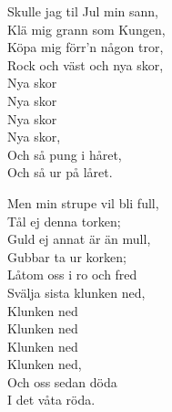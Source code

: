 Skulle jag til Jul min sann,\\
Klä mig grann som Kungen,\\
Köpa mig förr'n någon tror,\\
Rock och väst och nya skor,\\
	 Nya skor\\
	 Nya skor\\
	 Nya skor\\
	 Nya skor,\\
Och så pung i håret,\\
Och så ur på låret.\par
\vspace{10pt}
Men min strupe vil bli full,\\
Tål ej denna torken;\\
Guld ej annat är än mull,\\
Gubbar ta ur korken;\\
Låtom oss i ro och fred\\
Svälja sista klunken ned,\\
	Klunken ned\\
	Klunken ned\\
	Klunken ned\\
	Klunken ned,\\
Och oss sedan döda\\
I det våta röda.
